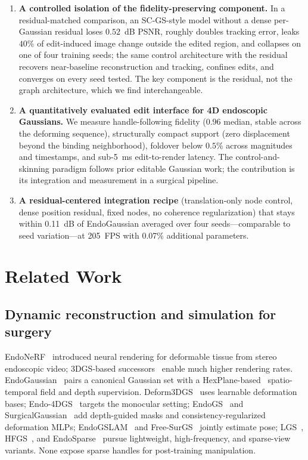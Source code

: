 \documentclass[ASNA,twocolumn]{USG} %
\begin{document}
\begin{enumerate}[1.]
\item \textbf{A controlled isolation of the fidelity-preserving component.} In a residual-matched comparison, an SC-GS-style model without a dense per-Gaussian residual loses $0.52$~dB PSNR, roughly doubles tracking error, leaks $40\%$ of edit-induced image change outside the edited region, and collapses on one of four training seeds; the same control architecture with the residual recovers near-baseline reconstruction and tracking, confines edits, and converges on every seed tested. The key component is the residual, not the graph architecture, which we find interchangeable.

\item \textbf{A quantitatively evaluated edit interface for 4D endoscopic Gaussians.} We measure handle-following fidelity ($0.96$ median, stable across the deforming sequence), structurally compact support (zero displacement beyond the binding neighborhood), foldover below $0.5\%$ across magnitudes and timestamps, and sub-5~ms edit-to-render latency. The control-and-skinning paradigm follows prior editable Gaussian work; the contribution is its integration and measurement in a surgical pipeline.

\item \textbf{A residual-centered integration recipe} (translation-only node control, dense position residual, fixed nodes, no coherence regularization) that stays within 0.11~dB of EndoGaussian averaged over four seeds---comparable to seed variation---at 205~FPS with 0.07\% additional parameters.
\end{enumerate}
\section{Related Work}\label{sec2}
\subsection{Dynamic reconstruction and simulation for surgery}

EndoNeRF~\cite{wang2022endonerf} introduced neural rendering for deformable tissue from stereo endoscopic video; 3DGS-based successors~\cite{kerbl2023gaussian} enable much higher rendering rates. EndoGaussian~\cite{liu2024endogaussian} pairs a canonical Gaussian set with a HexPlane-based~\cite{cao2023hexplane} spatio-temporal field and depth supervision. Deform3DGS~\cite{yang2024deform3dgs} uses learnable deformation bases; Endo-4DGS~\cite{huang2024endo4dgs} targets the monocular setting; EndoGS~\cite{zhu2024endogs} and SurgicalGaussian~\cite{xie2024surgicalgaussian} add depth-guided masks and consistency-regularized deformation MLPs; EndoGSLAM~\cite{wang2024endogslam} and Free-SurGS~\cite{guo2024freesurgs} jointly estimate pose; LGS~\cite{liu2024lgs}, HFGS~\cite{zhao2024hfgs}, and EndoSparse~\cite{li2024endosparse} pursue lightweight, high-frequency, and sparse-view variants. None expose sparse handles for post-training manipulation.
\end{document}
